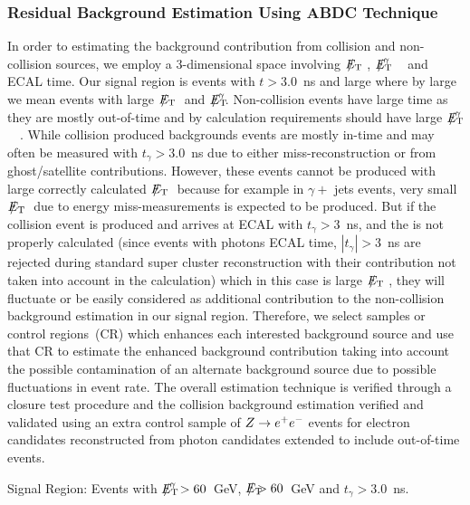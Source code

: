 \subsubsection*{Residual Background Estimation Using ABDC Technique}
In order to estimating the background contribution from collision and non-collision sources, we employ a 3-dimensional space involving ${E_{\mathrm{T}}\hspace{-1.2em}/}$~~, ${E_{\mathrm{T}}\hspace{-1.2em}/}^{\gamma}$~~ and ECAL time.  Our signal region is events with $t > 3.0$~ns and large \MET where by large \MET we mean events with  large  ${E_{\mathrm{T}}\hspace{-1.2em}/}$~~ and  ${E_{\mathrm{T}}\hspace{-1.2em}/}^{\gamma}$. Non-collision events have large time as they are mostly out-of-time and by \MET calculation requirements should have large  ${E_{\mathrm{T}}\hspace{-1.2em}/}^{\gamma}$~~. While collision produced backgrounds events are mostly in-time and may often be measured with $t_{\gamma} > 3.0$~ns due to either miss-reconstruction or from ghost/satellite contributions. However, these events cannot be produced with large correctly calculated $E_{\mathrm{T}}\hspace{-1.2em}/$~~ because for example in $\gamma +$ jets events, very small $E_{\mathrm{T}}\hspace{-1.2em}/$~~ due to energy miss-measurements is expected to be produced.
 But if the collision event is produced and arrives at ECAL with $t_{\gamma} > 3$~ns, and the \MET is not properly calculated (since events with photons ECAL time, $|t_{\gamma}| > 3$~ns are rejected during standard super cluster reconstruction with their \pt contribution  not taken into account in the \MET calculation) which in this case is large ${E_{\mathrm{T}}\hspace{-1.2em}/}$~~, they will fluctuate or be easily considered as additional contribution to the non-collision background estimation in our signal region.
Therefore, we select samples or control regions~(CR) which enhances each interested background source and use that CR to estimate the enhanced background contribution taking into account the possible contamination of an alternate background source due to possible fluctuations in event rate.
The overall estimation technique is verified through a closure test procedure and the collision background estimation verified and validated using an extra control sample of $Z \rightarrow e^+e^-$ events for electron candidates reconstructed from photon candidates extended to include out-of-time events.

Signal Region: Events with ${E_{\mathrm{T}}\hspace{-1.2em}/}^{\gamma} > 60$~GeV, ${E_{\mathrm{T}}\hspace{-1.2em}/} > 60$~GeV and $t_{\gamma} > 3.0$~ns.
